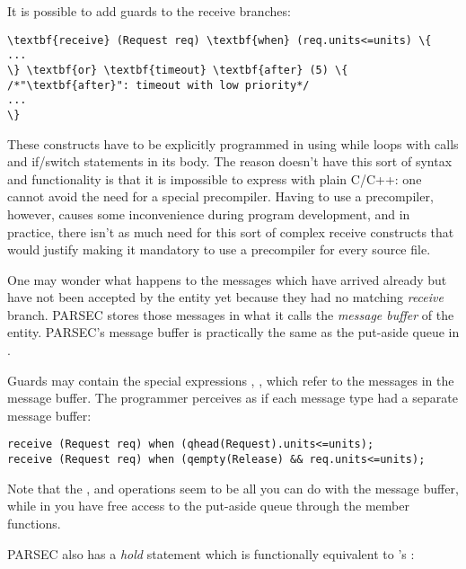 It is possible to add guards to the receive branches:

\begin{Verbatim}[commandchars=\\\{\}]
\textbf{receive} (Request req) \textbf{when} (req.units<=units) \{
...
\} \textbf{or} \textbf{timeout} \textbf{after} (5) \{ /*"\textbf{after}": timeout with low priority*/
...
\}
\end{Verbatim}


These constructs have to be explicitly programmed in {\opp} 
using while loops with  calls and if/switch statements 
in its body. The reason {\opp} doesn't have this sort of syntax 
and functionality is that it is impossible to express with plain 
C/C++: one cannot avoid the need for a special precompiler. Having 
to use a precompiler, however, causes some inconvenience during 
program development, and in practice, there isn't as much need 
for this sort of complex receive constructs that would justify 
making it mandatory to use a precompiler for every source file.


One may wonder what happens to the messages which have arrived 
already but have not been accepted by the entity yet because 
they had no matching \textit{receive} branch. PARSEC stores those 
messages in what it calls the \textit{message buffer} of the entity. 
PARSEC's message buffer is practically the same as the put-aside 
queue in {\opp}.

\begin{sloppypar}
Guards may contain the special expressions
,
,
 which refer to the
messages in the message buffer. The programmer perceives as if each
message type had a separate message buffer:
\end{sloppypar}

\begin{Verbatim}
receive (Request req) when (qhead(Request).units<=units);
receive (Request req) when (qempty(Release) && req.units<=units);
\end{Verbatim}


Note that the ,  and 
operations seem to be all you can do with the message buffer, while in
{\opp} you have free access to the put-aside queue through the
 member functions.

PARSEC also has a \textit{hold} statement which is functionally equivalent 
to {\opp}'s :

